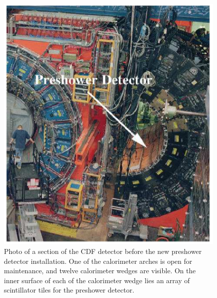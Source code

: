 \begin{figure}[htb!]
\begin{centering}
\includegraphics[scale=0.35]{CPR_Location2.png}
\caption{Photo of a section of the CDF detector before the new preshower detector installation. One of the calorimeter arches is open for maintenance, and twelve calorimeter wedges are visible. On the inner surface of each of the calorimeter wedge lies an array of scintillator tiles for the preshower detector.}
\label{fig_cprlocation}
\end{centering}
\end{figure}

